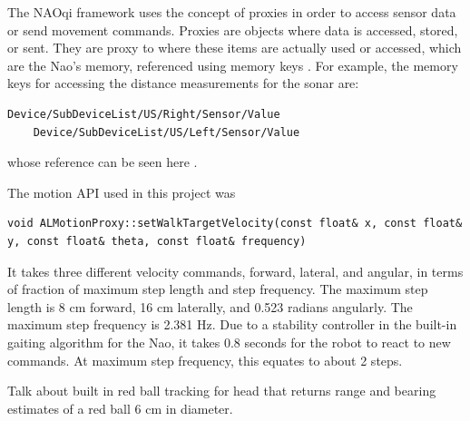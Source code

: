 The NAOqi framework uses the concept of proxies in order to access sensor data or send movement commands. Proxies are objects where data is accessed, stored, or sent. They are proxy to where these items are actually used or accessed, which are the Nao's memory, referenced using memory keys \cite{memory1}. For example, the memory keys for accessing the distance measurements for the sonar are:

\begin{lstlisting}[frame=single]
	Device/SubDeviceList/US/Right/Sensor/Value
	Device/SubDeviceList/US/Left/Sensor/Value
\end{lstlisting}

whose reference can be seen here \cite{sonar_ref1}.

The motion API used in this project was 

\begin{lstlisting}[frame=single]  
void ALMotionProxy::setWalkTargetVelocity(const float& x, const float& y, const float& theta, const float& frequency)
\end{lstlisting}

It takes three different velocity commands, forward, lateral, and angular, in terms of fraction of maximum step length and step frequency. The maximum step length is 8 cm forward, 16 cm laterally, and 0.523 radians angularly. The maximum step frequency is 2.381 Hz. Due to a stability controller in the built-in gaiting algorithm for the Nao, it takes 0.8 seconds for the robot to react to new commands. At maximum step frequency, this equates to about 2 steps. \cite{naodoc_motion1}

Talk about built in red ball tracking for head that returns range and bearing estimates of a red ball 6 cm in diameter.

